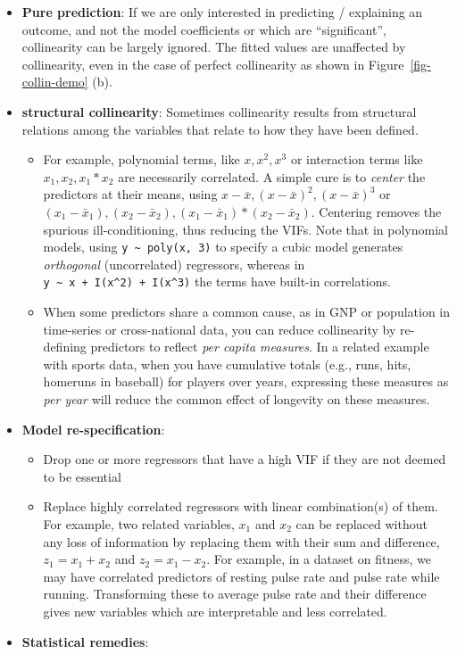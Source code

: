 \documentclass[
  letterpaper,
  10pt,
  krantz2]{krantz}
\begin{document}
\begin{itemize}
\item
  \textbf{Pure prediction}: If we are only interested in predicting /
  explaining an outcome, and not the model coefficients or which are
  ``significant'', collinearity can be largely ignored. The fitted
  values are unaffected by collinearity, even in the case of perfect
  collinearity as shown in Figure~\ref{fig-collin-demo} (b).
\item
  \textbf{structural collinearity}: Sometimes collinearity results from
  structural relations among the variables that relate to how they have
  been defined.

  \begin{itemize}
  \item
    For example, polynomial terms, like \(x, x^2, x^3\) or interaction
    terms like \(x_1, x_2, x_1 * x_2\) are necessarily correlated. A
    simple cure is to \emph{center} the predictors at their means, using
    \(x - \bar{x}, (x - \bar{x})^2, (x - \bar{x})^3\) or
    \((x_1 - \bar{x}_1), (x_2 - \bar{x}_2), (x_1 - \bar{x}_1) * (x_2 - \bar{x}_2)\).
    Centering removes the spurious ill-conditioning, thus reducing the
    VIFs. Note that in polynomial models, using
    \texttt{y\ \textasciitilde{}\ poly(x,\ 3)} to specify a cubic model
    generates \emph{orthogonal} (uncorrelated) regressors, whereas in
    \texttt{y\ \textasciitilde{}\ x\ +\ I(x\^{}2)\ +\ I(x\^{}3)} the
    terms have built-in correlations.
  \item
    When some predictors share a common cause, as in GNP or population
    in time-series or cross-national data, you can reduce collinearity
    by re-defining predictors to reflect \emph{per capita measures}. In
    a related example with sports data, when you have cumulative totals
    (e.g., runs, hits, homeruns in baseball) for players over years,
    expressing these measures as \emph{per year} will reduce the common
    effect of longevity on these measures.
  \end{itemize}
\item
  \textbf{Model re-specification}:

  \begin{itemize}
  \item
    Drop one or more regressors that have a high VIF if they are not
    deemed to be essential
  \item
    Replace highly correlated regressors with linear combination(s) of
    them. For example, two related variables, \(x_1\) and \(x_2\) can be
    replaced without any loss of information by replacing them with
    their sum and difference, \(z_1 = x_1 + x_2\) and
    \(z_2 = x_1 - x_2\). For example, in a dataset on fitness, we may
    have correlated predictors of resting pulse rate and pulse rate
    while running. Transforming these to average pulse rate and their
    difference gives new variables which are interpretable and less
    correlated.
  \end{itemize}
\item
  \textbf{Statistical remedies}:


\end{itemize}
\end{document}
